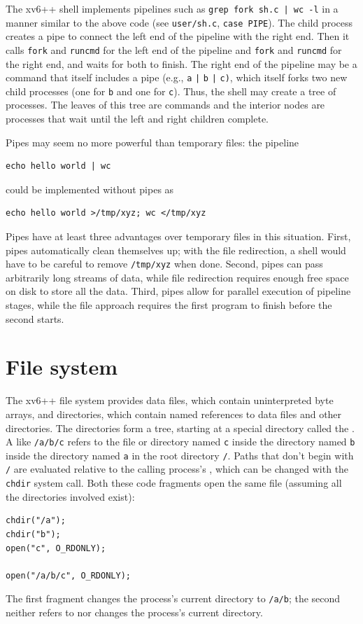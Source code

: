 The xv6++ shell implements pipelines such as
\lstinline{grep fork sh.c | wc -l}
in a manner similar to the above code
(see \texttt{user/sh.c}, \texttt{case PIPE}).
The child process creates a pipe to connect the left end of the pipeline
with the right end. Then it calls
\lstinline{fork}
and
\lstinline{runcmd}
for the left end of the pipeline
and
\lstinline{fork}
and
\lstinline{runcmd}
for the right end, and waits for both to finish.
The right end of the pipeline may be a command that itself includes a
pipe (e.g.,
\lstinline{a}
\lstinline{|}
\lstinline{b}
\lstinline{|}
\lstinline{c)},
which itself forks two new child processes (one for
\lstinline{b}
and one for
\lstinline{c}).
Thus, the shell may
create a tree of processes.  The leaves of this tree are commands and
the interior nodes are processes that wait until the left and right
children complete.

Pipes may seem no more powerful than temporary files:
the pipeline
\begin{lstlisting}[]
echo hello world | wc
\end{lstlisting}
could be implemented without pipes as
\begin{lstlisting}[]
echo hello world >/tmp/xyz; wc </tmp/xyz
\end{lstlisting}
Pipes have at least three advantages over temporary files
in this situation.
First, pipes automatically clean themselves up;
with the file redirection, a shell would have to
be careful to remove
\lstinline{/tmp/xyz}
when done.
Second, pipes can pass arbitrarily long streams of
data, while file redirection requires enough free space
on disk to store all the data.
Third, pipes allow for parallel execution of pipeline stages,
while the file approach requires the first program to finish
before the second starts.

\section{File system}

The xv6++ file system provides data files,
which contain uninterpreted byte arrays,
and directories, which
contain named references to data files and other directories.
The directories form a tree, starting
at a special directory called the
.
A
like
\lstinline{/a/b/c}
refers to the file or directory named
\lstinline{c}
inside the directory named
\lstinline{b}
inside the directory named
\lstinline{a}
in the root directory
\lstinline{/}.
Paths that don't begin with
\lstinline{/}
are evaluated relative to the calling process's
,
which can be changed with the
\lstinline{chdir}
system call.
Both these code fragments open the same file
(assuming all the directories involved exist):
\begin{lstlisting}[]
chdir("/a");
chdir("b");
open("c", O_RDONLY);

open("/a/b/c", O_RDONLY);
\end{lstlisting}
The first fragment changes the process's current directory to
\lstinline{/a/b};
the second neither refers to nor changes the process's current directory.

